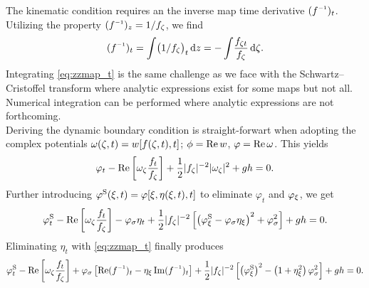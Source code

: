The kinematic condition requires an the inverse map time derivative $(\zzmap)_t$. 
Utilizing the property $(\zzmap)_\z = 1/\zmap_\zz$, we find
\begin{equation}
(\zzmap)_t = \int \!\big(1/\zmap_\zz\big)_t \,\dd z = -\int\! \frac{\zmap_{\zz t}}{\zmap_\zz} \,\dd\zz.
\label{eq:zzmap_t}
\end{equation}
Integrating \eqref{eq:zzmap_t} is the same challenge as we face with the Schwartz--Cristoffel transform where
analytic expressions exist for some maps but not all. Numerical integration can be performed where analytic expressions are not forthcoming. 
\\

Deriving the dynamic boundary condition is straight-forwart when adopting the complex potentials $\omega(\zeta,t)=w[f(\zeta,t),t]$; $\phi=\operatorname{Re}w$, $\varphi = \operatorname{Re}\omega$.
This yields
\begin{equation}
\varphi_t - \operatorname{Re}\left[\omega_\zeta \frac{f_t}{f_\zeta}\right] + \frac12|f_\zeta|^{-2}|\omega_\zeta|^2 + gh = 0.
\label{eq:}
\end{equation}
Further introducing $\varphi^\mathrm{S}(\xi,t)=\varphi[\xi,\eta(\xi,t),t]$ to eliminate $\varphi_t$ and $\varphi_\xi$, we get 
\begin{equation*}
\varphi^\mathrm{S}_t - \operatorname{Re}\left[\omega_\zeta \frac{f_t}{f_\zeta}\right]-\varphi_\sigma \eta_t
 + \frac12|f_\zeta|^{-2}\left[\left(\varphi^\mathrm{S}_\xi-\varphi_\sigma\eta_\xi\right)^2+\varphi_\sigma^2\right] + gh = 0.
\end{equation*}
%
Eliminating $\eta_t$ with \eqref{eq:zzmap_t} finally produces
\begin{equation}
\varphi\S_t - \Re\sbr{\ww_\zz \frac{\zmap_t}{\zmap_\zz}}
+ \varphi_\yy\sbr{\Re(\zzmap)_t-\eta_\xx\Im(\zzmap)_t}
 + \frac12|\zmap_\zz|^{-2}\sbr{\rbr{\varphi\S_\xx}^2-\rbr{1+\eta_\xx^2}\varphi_\yy^2} + gh = 0.
\label{eq:BC_dyn_transient}
\end{equation}
\\

